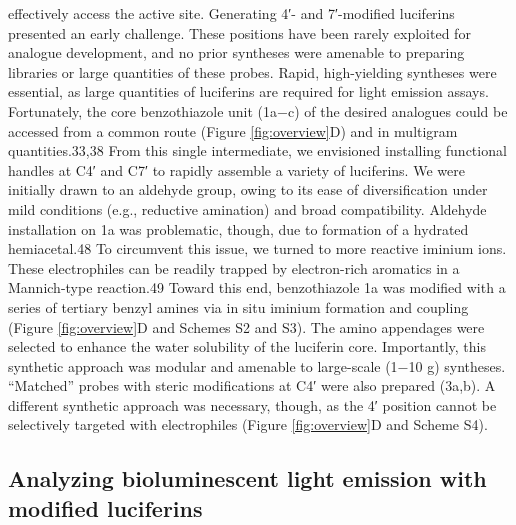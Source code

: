 effectively access the active site.
Generating 4′- and 7′-modified luciferins presented an early
challenge. These positions have been rarely exploited for
analogue development, and no prior syntheses were amenable
to preparing libraries or large quantities of these probes. Rapid,
high-yielding syntheses were essential, as large quantities of
luciferins are required for light emission assays. Fortunately, the
core benzothiazole unit (1a−c) of the desired analogues could
be accessed from a common route (Figure \ref{fig:overview}D) and in
multigram quantities.33,38 From this single intermediate, we
envisioned installing functional handles at C4′ and C7′ to
rapidly assemble a variety of luciferins. We were initially drawn
to an aldehyde group, owing to its ease of diversification under
mild conditions (e.g., reductive amination) and broad
compatibility. Aldehyde installation on 1a was problematic,
though, due to formation of a hydrated hemiacetal.48 To circumvent this issue, we turned to more reactive
iminium ions. These electrophiles can be readily trapped by
electron-rich aromatics in a Mannich-type reaction.49 Toward this end, benzothiazole 1a was modified with a series of tertiary
benzyl amines via in situ iminium formation and coupling
(Figure \ref{fig:overview}D and Schemes S2 and S3). The amino appendages
were selected to enhance the water solubility of the luciferin
core. Importantly, this synthetic approach was modular and
amenable to large-scale (1−10 g) syntheses. “Matched” probes
with steric modifications at C4′ were also prepared (3a,b). A
different synthetic approach was necessary, though, as the 4′
position cannot be selectively targeted with electrophiles
(Figure \ref{fig:overview}D and Scheme S4).

\subsection*{Analyzing bioluminescent light emission with modified luciferins}

